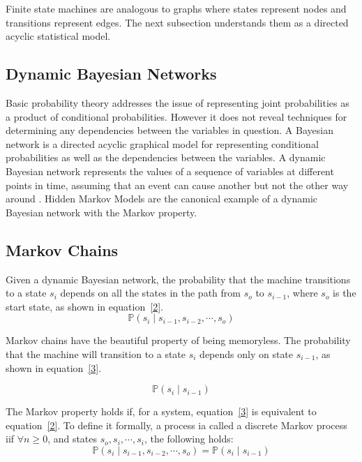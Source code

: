 \documentclass[10pt]{article}
\begin{document}
Finite state machines are analogous to graphs where states represent nodes and
transitions represent edges. The next subsection understands them as a
directed acyclic statistical model.

\subsection{Dynamic Bayesian Networks}
Basic probability theory addresses the issue of representing joint
probabilities as a product of conditional probabilities. However it does not 
reveal techniques for determining any dependencies between the variables in 
question. A Bayesian network is a directed acyclic graphical model for representing conditional
probabilities as well as the dependencies between the variables. A
dynamic Bayesian network represents the values of a sequence of variables at
different points in time, assuming that an event can cause another but not the
other way around \cite{vierti}. Hidden Markov Models are the canonical example
of a dynamic Bayesian network with the Markov property.

\subsection{Markov Chains}
Given a dynamic Bayesian network, the probability that the machine transitions
to a state $s_i$ depends on all the states in the path from $s_o$ to $s_{i-1}$,
where $s_o$ is the start state, as shown in equation~\ref{2}. 
\begin{equation}
\mathds{P}(s_i \mid s_{i-1}, s_{i-2}, \cdots, s_o)
\label{2}
\end{equation}

Markov chains have the beautiful property of being memoryless. The probability
that the machine will transition to a state $s_i$ depends only on state
$s_{i-1}$, as shown in equation~\ref{3}. 

\begin{equation}
\mathds{P}(s_i \mid s_{i-1})
\label{3}
\end{equation}

The Markov property holds if, for a
system, equation~\ref{3} is equivalent to equation~\ref{2}.
To define it formally, a process ia called a discrete Markov process iif 
$\forall n \geq 0$, and states $s_o, s_i, \cdots, s_i$, the following holds:\cite{dm}
\[ \mathds{P}( s_i \mid s_{i-1}, s_{i-2}, \cdots, s_o ) = \mathds{P}( s_i \mid
s_{i-1} ) \] 
\end{document}
